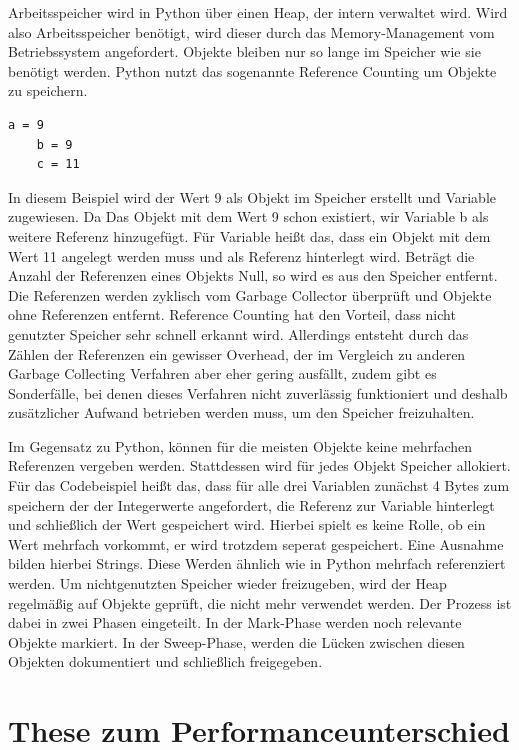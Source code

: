 Arbeitsspeicher wird in Python über einen Heap, der intern verwaltet wird. Wird also Arbeitsspeicher benötigt, 
wird dieser durch das Memory-Management vom Betriebssystem angefordert. Objekte bleiben nur so lange im Speicher 
wie sie benötigt werden. Python nutzt das sogenannte Reference Counting um Objekte zu speichern.

\begin{lstlisting}[caption={Codebeispiel zur Verwaltung von Objekten in Python}]
    a = 9
    b = 9
    c = 11
\end{lstlisting}

In diesem Beispiel wird der Wert 9 als Objekt im Speicher erstellt und Variable  zugewiesen. Da 
Das Objekt mit dem Wert 9 schon existiert, wir Variable {b} als weitere Referenz hinzugefügt. Für Variable 
 heißt das, dass ein Objekt mit dem Wert 11 angelegt werden muss und  als Referenz hinterlegt wird. 
Beträgt die Anzahl der Referenzen eines Objekts Null, so wird es aus den Speicher entfernt. Die Referenzen 
werden zyklisch vom Garbage Collector überprüft und Objekte ohne Referenzen entfernt.\autocite[Vgl.][]{PabloGalindoSalgado.2021} 
Reference Counting hat den Vorteil, dass nicht genutzter Speicher sehr schnell erkannt wird. Allerdings entsteht durch das Zählen 
der Referenzen ein gewisser Overhead, der im Vergleich zu anderen Garbage Collecting Verfahren aber eher gering ausfällt, 
zudem gibt es Sonderfälle, bei denen dieses Verfahren nicht zuverlässig funktioniert und deshalb zusätzlicher Aufwand 
betrieben werden muss, um den Speicher freizuhalten.

Im Gegensatz zu Python, können für die meisten Objekte keine mehrfachen Referenzen vergeben werden. Stattdessen wird für jedes 
Objekt Speicher allokiert. Für das Codebeispiel heißt das, dass für alle drei Variablen zunächst 4 Bytes zum speichern der 
der Integerwerte angefordert, die Referenz zur Variable hinterlegt und schließlich der Wert gespeichert wird. Hierbei spielt 
es keine Rolle, ob ein Wert mehrfach vorkommt, er wird trotzdem seperat gespeichert. Eine Ausnahme bilden hierbei Strings. 
Diese Werden ähnlich wie in Python mehrfach referenziert werden. Um nichtgenutzten Speicher wieder freizugeben, wird der Heap 
regelmäßig auf Objekte geprüft, die nicht mehr verwendet werden. Der Prozess ist dabei in zwei Phasen eingeteilt. In der Mark-Phase 
werden noch relevante Objekte markiert. In der Sweep-Phase, werden die Lücken zwischen diesen Objekten dokumentiert und schließlich 
freigegeben.\autocite[Vgl.][]{OracleGC.2021}

\section{These zum Performanceunterschied}